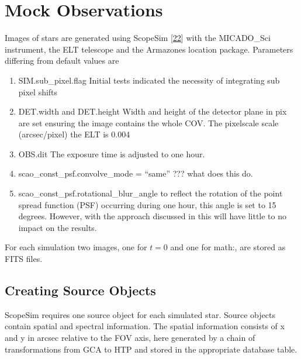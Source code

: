 \documentclass[letterpaper,10pt,english]{sphinxmanual}
\begin{document}
\chapter{Mock Observations}
\label{\detokenize{NBodySimulation/MockObservations:mock-observations}}\label{\detokenize{NBodySimulation/MockObservations::doc}}
\sphinxAtStartPar
Images of stars are generated using ScopeSim {[}\hyperlink{cite.NBodySimulation/Appendix:id50}{22}{]} with the MICADO\_Sci instrument, the ELT telescope and the Armazones location package.
Parameters differing from default values are
\begin{enumerate}
%
\item {} 
\sphinxAtStartPar
SIM.sub\_pixel.flag \sphinxhyphen{} Initial tests indicated the necessity of integrating sub pixel shifts

\item {} 
\sphinxAtStartPar
DET.width and DET.height \sphinxhyphen{} Width and height of the detector plane in pix are set ensuring the image contains the whole COV. The pixelscale scale (arcsec/pixel) the ELT is 0.004

\item {} 
\sphinxAtStartPar
OBS.dit \sphinxhyphen{} The exposure time is adjusted to one hour.

\item {} 
\sphinxAtStartPar
scao\_const\_psf.convolve\_mode = “same” ??? what does this do.

\item {} 
\sphinxAtStartPar
scao\_const\_psf.rotational\_blur\_angle \sphinxhyphen{} to reflect the rotation of the point spread function (PSF) occurring during one hour, this angle is set to 15 degrees. However, with the approach discussed in {\hyperref[\detokenize{NBodySimulation/DataReduction:masking-bright-stars-label}]{}} this will have little to no impact on the results.

\end{enumerate}

\sphinxAtStartPar
For each simulation two images, one for \(t=0\) and one for math:, are stored as FITS files.


\section{Creating Source Objects}
\label{\detokenize{NBodySimulation/MockObservations:creating-source-objects}}
\sphinxAtStartPar
ScopeSim requires one source object for each simulated star. Source objects contain spatial and spectral information.
The spatial information consists of x and y in arcsec relative to the FOV axis, here generated by a chain of transformations from GCA to HTP and stored in the appropriate database table.
\end{document}
